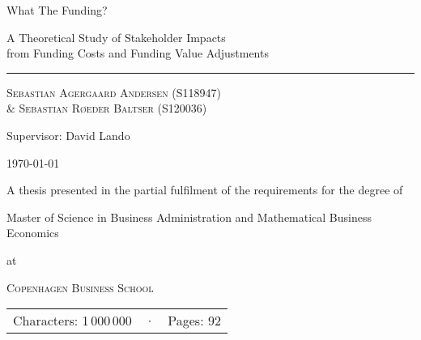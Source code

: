 \documentclass[main.tex]{subfiles}
\begin{document}
	\begin{titlepage}
		\centering
		\vspace{5cm}
		{\fontsize{48pt}{1pt}\selectfont What The Funding? \par}
		\vspace{0.5cm}
		{\Large A Theoretical Study of Stakeholder Impacts \\ 
		from Funding Costs and Funding Value Adjustments \par}
		\rule{\textwidth}{1px}\par
		{\scshape\large 
			Sebastian Agergaard Andersen {\scriptsize(S118947)} \\
			\& Sebastian Røeder Baltser {\scriptsize(S120036)}
		\par}
		Supervisor: David Lando \\
		
		\vfill
		
		{\Large \today \par}		
		{A thesis presented in the partial fulfilment
		of the requirements for the degree of \\}
		{\Large Master of Science in Business Administration and Mathematical Business Economics \par}
		at \par 
		{\scshape\LARGE Copenhagen Business School\par}
		\vspace{0.5cm}
		\begin{tabular}{>{\raggedleft\arraybackslash}m{5cm}>{\centering\arraybackslash}m{0.75cm}>{\raggedright\arraybackslash}m{5cm}}
		Characters: 1\,000\,000 & · & Pages: 92 \\
		\end{tabular}
		
		\thispagestyle{empty}
	\end{titlepage}
\end{document}
